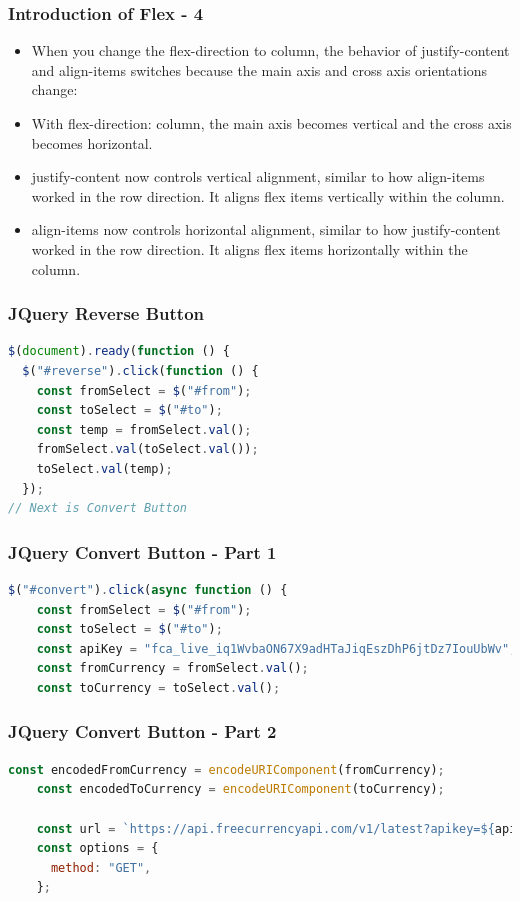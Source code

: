 \documentclass[aspectratio=169, table]{beamer}
\begin{document}
\begin{frame}
    \frametitle{Introduction of Flex - 4}
    \vskip1cm
    \begin{itemize}
        \item When you change the flex-direction to column, the behavior of justify-content and align-items switches because the main axis and cross axis orientations change:
	\item With flex-direction: column, the main axis becomes vertical and the cross axis becomes horizontal.
	\item justify-content now controls vertical alignment, similar to how align-items worked in the row direction. It aligns flex items vertically within the column.
	\item align-items now controls horizontal alignment, similar to how justify-content worked in the row direction. It aligns flex items horizontally within the column.
    \end{itemize}
\end{frame}




\begin{frame}[fragile]
    \frametitle{JQuery Reverse Button}
    \begin{lstlisting}[language=JavaScript]
$(document).ready(function () {
  $("#reverse").click(function () {
    const fromSelect = $("#from");
    const toSelect = $("#to");
    const temp = fromSelect.val();
    fromSelect.val(toSelect.val());
    toSelect.val(temp);
  });
// Next is Convert Button
    \end{lstlisting}
\end{frame}

\begin{frame}[fragile]
    \frametitle{JQuery Convert Button - Part 1}
    \begin{lstlisting}[language=JavaScript]
  $("#convert").click(async function () {
    const fromSelect = $("#from");
    const toSelect = $("#to");
    const apiKey = "fca_live_iq1WvbaON67X9adHTaJiqEszDhP6jtDz7IouUbWv";
    const fromCurrency = fromSelect.val();
    const toCurrency = toSelect.val();
    \end{lstlisting}
\end{frame}

\begin{frame}[fragile]
    \frametitle{JQuery Convert Button - Part 2}
    \begin{lstlisting}[language=JavaScript]
const encodedFromCurrency = encodeURIComponent(fromCurrency);
    const encodedToCurrency = encodeURIComponent(toCurrency);

    const url = `https://api.freecurrencyapi.com/v1/latest?apikey=${apiKey}&currencies=${encodedToCurrency}&base_currency=${encodedFromCurrency}`;
    const options = {
      method: "GET",
    };
    \end{lstlisting}
\end{frame}
\end{document}
